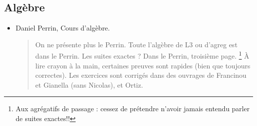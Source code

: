 \documentclass{article}
\begin{document}
\subsection{Algèbre}
\begin{mdframed}
\begin{itemize}
\item Daniel Perrin, Cours d'algèbre.
\begin{quote}
On ne présente plus \og le Perrin\fg. Toute l'algèbre de L3 ou d'agreg est \og dans le Perrin\fg. Les suites exactes ? Dans le Perrin, troisième page. \footnote{Aux agrégatifs de passage : cessez de prétendre n'avoir jamais entendu parler de suites exactes!!} À lire crayon à la main, certaines preuves sont rapides (bien que toujours correctes). Les exercices sont corrigés dans des ouvrages de Francinou et Gianella (sans Nicolas), et Ortiz.
\end{quote}
\end{itemize}
\end{mdframed}
\end{document}

